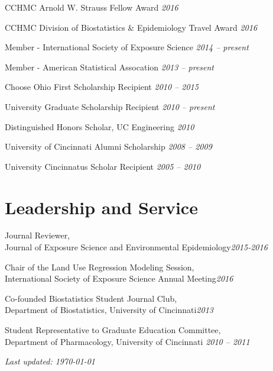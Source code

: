 \documentclass[margin,line]{res}
\newenvironment{list3}{
  \begin{list}{}{%
      \setlength{\itemsep}{0in}
      \setlength{\parsep}{0in} \setlength{\parskip}{0in}
      \setlength{\topsep}{0in} \setlength{\partopsep}{0in} 
      \setlength{\leftmargin}{0in}}}{\end{list}}
\begin{document}
\begin{resume}
\begin{list3} \itemsep 4pt   
\item[] CCHMC Arnold W. Strauss Fellow Award \hfill \textit{2016}
\item[] CCHMC Division of Biostatistics \& Epidemiology Travel Award \hfill \textit{2016}
\item[] Member - International Society of Exposure Science \hfill \textit{2014 -- present}
\item[] Member - American Statistical Assocation \hfill \textit{2013 -- present}
\item[] Choose Ohio First Scholarship Recipient \hfill \textit{2010 -- 2015}
\item[] University Graduate Scholarship Recipient \hfill \textit{2010 -- present}
\item[] Distinguished Honors Scholar, UC Engineering \hfill \textit{2010}
\item[] University of Cincinnati Alumni Scholarship \hfill \textit{2008 -- 2009}
\item[] University Cincinnatus Scholar Recipient \hfill \textit{2005 -- 2010}
\end{list3}


\section{\sc Leadership and Service} 
\begin{list3} \itemsep 4pt     
\item[] Journal Reviewer, \\Journal of Exposure Science and Environmental Epidemiology\hfill \textit{2015-2016} 
\item[] Chair of the Land Use Regression Modeling Session, \\International Society of Exposure Science Annual Meeting\hfill \textit{2016} 
\item[] Co-founded Biostatistics Student Journal Club, \\Department of Biostatistics, University of Cincinnati\hfill \textit{2013} 
\item[] Student Representative to Graduate Education Committee, \\Department of Pharmacology, University of Cincinnati \hfill \textit{2010 -- 2011}
\end{list3}

\end{resume}

\vfill

\hfill \textit{Last updated: \today}
\end{document}
